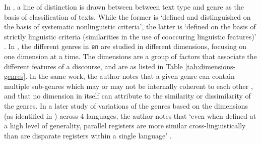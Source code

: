 In \cite{biber2}, a line of distinction is drawn between between text type and genre as the basis of classification of texts. While the former is `defined and distinguished on the basis of systematic nonlinguistic criteria', the latter is `defined on the basis of strictly linguistic criteria (similarities in the use of cooccuring linguistic features)' \cite[p.~39]{biber2}. In \cite{biber}, the different genres in \verb|en| are studied in different dimensions, focusing on one dimension at a time. The dimensions are a group of factors that associate the different features of a discourse, and are as listed in Table \ref{tab:dimensions-genres}. In the same work, the author notes that a given genre can contain multiple sub-genres which may or may not be internally coherent to each other \cite[p.~170]{biber}, and that no dimension in itself can attribute to the similarity or dissimilarity of the genres. In a later study of variations of the genres based on the dimensions (as identified in \cite{biber}) across 4 languages, the author notes that `even when defined at a high level of generality, parallel registers are more similar cross-linguistically than are disparate registers within a single language' \cite[p.~279]{biberbook}.


